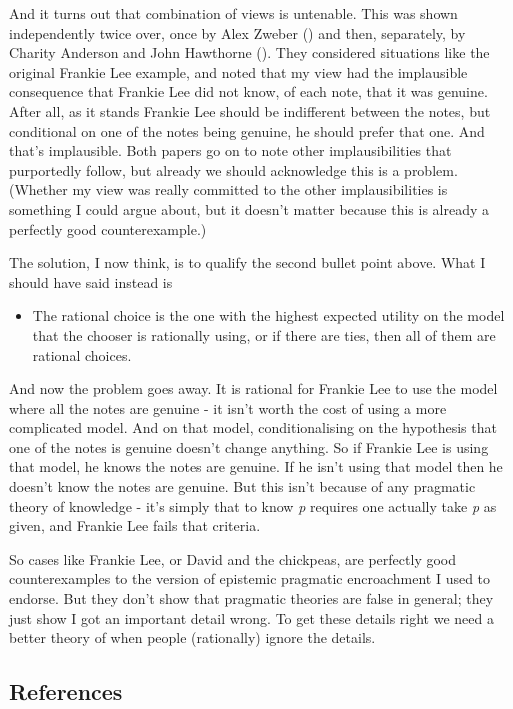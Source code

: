 \documentclass[
  11pt,
  letterpaper,
  DIV=11,
  numbers=noendperiod,
  twoside]{scrartcl}
\providecommand{\tightlist}{%
  \setlength{\itemsep}{0pt}\setlength{\parskip}{0pt}}\usepackage{longtable,booktabs,array}
\begin{document}
And it turns out that combination of views is untenable. This was shown
independently twice over, once by Alex Zweber
() and then, separately, by Charity
Anderson and John Hawthorne
(). They considered
situations like the original Frankie Lee example, and noted that my view
had the implausible consequence that Frankie Lee did not know, of each
note, that it was genuine. After all, as it stands Frankie Lee should be
indifferent between the notes, but conditional on one of the notes being
genuine, he should prefer that one. And that's implausible. Both papers
go on to note other implausibilities that purportedly follow, but
already we should acknowledge this is a problem. (Whether my view was
really committed to the other implausibilities is something I could
argue about, but it doesn't matter because this is already a perfectly
good counterexample.)

The solution, I now think, is to qualify the second bullet point above.
What I should have said instead is

\begin{itemize}
\tightlist
\item
  The rational choice is the one with the highest expected utility on
  the model that the chooser is rationally using, or if there are ties,
  then all of them are rational choices.
\end{itemize}

And now the problem goes away. It is rational for Frankie Lee to use the
model where all the notes are genuine - it isn't worth the cost of using
a more complicated model. And on that model, conditionalising on the
hypothesis that one of the notes is genuine doesn't change anything. So
if Frankie Lee is using that model, he knows the notes are genuine. If
he isn't using that model then he doesn't know the notes are genuine.
But this isn't because of any pragmatic theory of knowledge - it's
simply that to know \emph{p} requires one actually take \emph{p} as
given, and Frankie Lee fails that criteria.

So cases like Frankie Lee, or David and the chickpeas, are perfectly
good counterexamples to the version of epistemic pragmatic encroachment
I used to endorse. But they don't show that pragmatic theories are false
in general; they just show I got an important detail wrong. To get these
details right we need a better theory of when people (rationally) ignore
the details.

\subsection*{References}\label{references}
\end{document}
